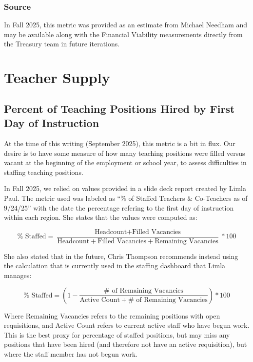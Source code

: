 \documentclass[
  letterpaper,
  DIV=11,
  numbers=noendperiod]{scrreprt}
\begin{document}
\subsection{Source}\label{source-3}

In Fall 2025, this metric was provided as an estimate from Michael
Needham and may be available along with the Financial Viability
measurements directly from the Treasury team in future iterations.


\chapter{Teacher Supply}\label{sec-TeacherSupply}

\section{Percent of Teaching Positions Hired by First Day of
Instruction}\label{sec-TeachHire}

At the time of this writing (September 2025), this metric is a bit in
flux. Our desire is to have some measure of how many teaching positions
were filled versus vacant at the beginning of the employment or school
year, to assess difficulties in staffing teaching positions.

In Fall 2025, we relied on values provided in a slide deck report
created by Limla Paul. The metric used was labeled as ``\% of Staffed
Teachers \& Co-Teachers as of 9/24/25'' with the date the percentage
refering to the first day of instruction within each region. She states
that the values were computed as:

\[
\% \text{ Staffed} = \frac{\text{Headcount} + \text{Filled Vacancies}}{\text{Headcount} + \text{Filled Vacancies} + \text{Remaining Vacancies}}*100
\]

She also stated that in the future, Chris Thompson recommends instead
using the calculation that is currently used in the staffing dashboard
that Limla manages:

\[
\% \text{ Staffed} = \left(1 - \frac{\# \text{ of Remaining Vacancies}}{\text{Active Count} + \# \text{ of Remaining Vacancies}}\right)*100
\]

Where Remaining Vacancies refers to the remaining positions with open
requisitions, and Active Count refers to current active staff who have
begun work. This is the best proxy for percentage of staffed positions,
but may miss any positions that have been hired (and therefore not have
an active requisition), but where the staff member has not begun work.
\end{document}
